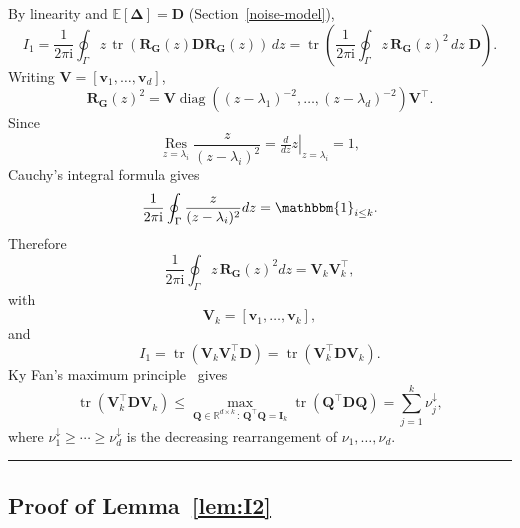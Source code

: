 \documentclass{article}
\newcommand{\Ex}[1]{\mbox{}\mathbb{E}\left[#1\right]}
\newcommand{\ts}{\top}
\newcommand{\R}{\mathbb{R}} %
\newcommand{\vb}{\mathbf{v}}
\newcommand{\Db}{\mathbf{D}}
\newcommand{\Gb}{\mathbf{G}}
\newcommand{\Ib}{\mathbf{I}}
\newcommand{\Qb}{\mathbf{Q}}
\newcommand{\Rb}{\mathbf{R}}
\newcommand{\Vb}{\mathbf{V}}
\newcommand{\BlackBox}{\rule{1.5ex}{1.5ex}}  %
\newenvironment{proof}{\par\noindent{\bf Proof\ }}{\hfill\BlackBox\par\medskip}
\newcommand{\tr}{\mathop{\mathrm{tr}}}
\newcommand{\diag}{\mathop{\mathrm{diag}}}
\newcommand{\rbr}[1]{\left(#1\right)}
\newcommand{\Deltab}{\boldsymbol{\Delta}}
\begin{document}
\begin{proof}
By linearity and $\Ex{\Deltab}=\Db$ (Section~\ref{noise-model}),
\begin{equation*}
    I_1 = \frac{1}{2\pi \mathrm{i}}\oint_\Gamma z\,\tr\rbr{\Rb_\Gb(z)\Db\Rb_\Gb(z)}\,dz = \tr\rbr{\frac{1}{2\pi \mathrm{i}}\oint_\Gamma z\,\Rb_\Gb(z)^2\,dz \;\Db}.
\end{equation*}
Writing $\Vb = [\vb_1,\dots,\vb_d]$,
\begin{equation*}
    \Rb_\Gb(z)^2 = \Vb\diag\rbr{(z-\lambda_1)^{-2},\dots,(z-\lambda_d)^{-2}}\Vb^\ts.
\end{equation*}
Since
\begin{equation}
    \operatorname*{Res}_{z=\lambda_i}\frac{z}{(z-\lambda_i)^2} = \left.\tfrac{d}{dz}z\right|_{z=\lambda_i}=1,
\end{equation}
Cauchy's integral formula gives
\begin{equation}
    \frac{1}{2\pi \mathrm{i}}\oint_\Gamma \frac{z}{(z-\lambda_i)^2}dz = \mathbbm{1}_{i\le k}.
\end{equation}
Therefore 
\begin{equation}
    \frac{1}{2\pi \mathrm{i}}\oint_\Gamma z\,\Rb_\Gb(z)^2 dz = \Vb_k\Vb_k^\ts,
\end{equation}
with 
\begin{equation}
    \Vb_k=[\vb_1,\dots,\vb_k],
\end{equation}
and
\begin{equation*}
    I_1 = \tr\rbr{\Vb_k\Vb_k^\ts \Db} = \tr\rbr{\Vb_k^\ts \Db \Vb_k}.
\end{equation*}
Ky Fan's maximum principle~\citep[Theorem 1]{fan1949theorem} gives
\begin{equation*}
    \tr\rbr{\Vb_k^\ts \Db \Vb_k} \le \max_{\Qb\in\R^{d\times k}\,:\,\Qb^\ts \Qb=\Ib_k}\tr\rbr{\Qb^\ts \Db \Qb} = \sum_{j=1}^{k}\nu_j^\downarrow,
\end{equation*}
where $\nu_1^\downarrow \ge \cdots \ge \nu_d^\downarrow$ is the decreasing rearrangement of $\nu_1,\dots,\nu_d$.
\end{proof}

\subsection{Proof of Lemma~\ref{lem:I2}}\label{app:I2}
\end{document}
